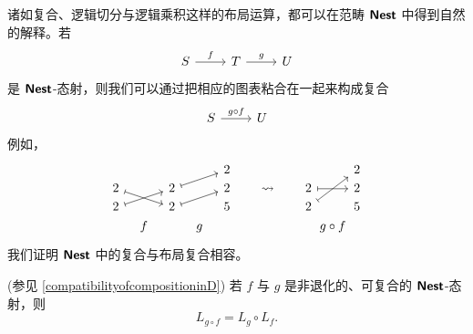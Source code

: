 诸如复合、逻辑切分与逻辑乘积这样的布局运算，都可以在范畴 ${\boldsymbol{\mathsf{Nest}}}$ 中得到自然的解释。若
\[
\begin{tikzcd}
    S \ar[r,"f"]  & T \ar[r,"g"]  & U
\end{tikzcd}
\]
是 ${\boldsymbol{\mathsf{Nest}}}$-态射，则我们可以通过把相应的图表粘合在一起来构成复合
\[\begin{tikzcd}
S \ar[r,"g \circ f"] &  U
\end{tikzcd} \]
例如，
\[ \begin{tikzcd}[row sep = 1, column sep = 8]
 & &   & & 2 & & & & & & 2\\
2 \ar[drr,mapsto]  & & 2 \ar[urr,mapsto] & & 2 & & \rightsquigarrow & & 2 \ar[rr,mapsto]  & & 2\\
2 \ar[urr,mapsto] & & 2 \ar[urr,mapsto] & & 5 & & & & 2 \ar[uurr,mapsto] & & 5\\
 & f & & g & & & & & & \mathclap{g \circ f} &
\end{tikzcd}\]
我们证明 ${\boldsymbol{\mathsf{Nest}}}$ 中的复合与布局复合相容。
\begin{mainthm}(参见 \ref{compatibilityofcompositioninD}) 若 $f$ 与 $g$ 是非退化的、可复合的 ${\boldsymbol{\mathsf{Nest}}}$-态射，则
\[
L_{g \circ f} = L_g \circ L_f.
\]
\end{mainthm}

